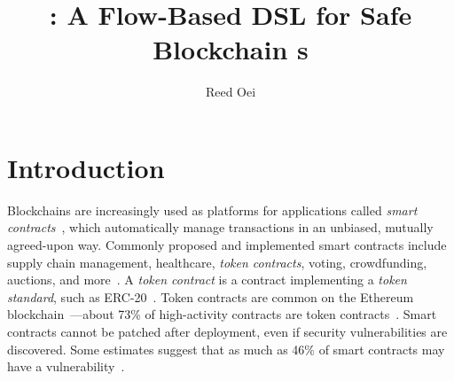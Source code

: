 \documentclass[dvipsnames,runningheads]{llncs}
\begin{document}
\title{\langName: A Flow-Based DSL for Safe Blockchain \AssetTxt{}s}

\author{Reed Oei}

\maketitle


\section{Introduction}
Blockchains are increasingly used as platforms for applications called \emph{smart contracts}~\cite{Szabo97:Formalizing}, which automatically manage transactions in an unbiased, mutually agreed-upon way.
Commonly proposed and implemented smart contracts include supply chain management, healthcare, \emph{token contracts}, voting, crowdfunding, auctions, and more~\cite{SupplyChainUse,HealthcareUse,Elsden18:Making}.
A \emph{token contract} is a contract implementing a \emph{token standard}, such as ERC-20~\cite{erc20}.
Token contracts are common on the Ethereum blockchain~\cite{wood2014ethereum}---about 73\% of high-activity contracts are token contracts~\cite{OlivaEtAl2019}.
Smart contracts cannot be patched after deployment, even if security vulnerabilities are discovered.
Some estimates suggest that as much as 46\% of smart contracts may have a vulnerability~\cite{luuOyente}.
\end{document}
